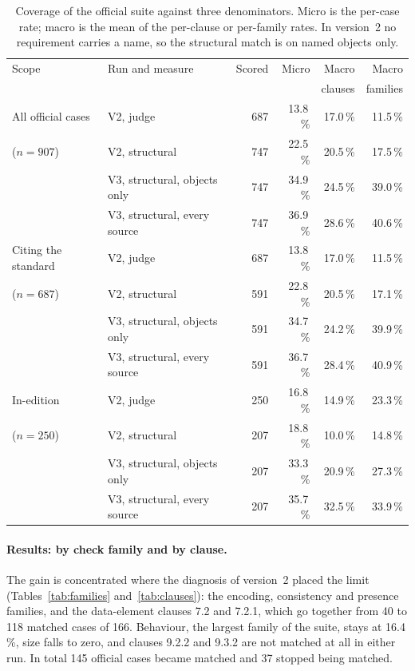 \begin{table}[t]
  \centering
  \caption{Coverage of the official suite against three denominators. Micro is
    the per-case rate; macro is the mean of the per-clause or per-family
    rates. In version~2 no requirement carries a name, so the structural
    match is on named objects only.}
  \label{tab:denominators}
  \small\setlength{\tabcolsep}{4pt}
  \begin{tabular}{llrrrr}
    \toprule
    Scope & Run and measure & Scored & Micro & Macro & Macro \\
          &                 &        &       & clauses & families \\
    \midrule
    All official cases & V2, judge                      & 687 & 13.8\,\% & 17.0\,\% & 11.5\,\% \\
    ($n = 907$)        & V2, structural                 & 747 & 22.5\,\% & 20.5\,\% & 17.5\,\% \\
                       & V3, structural, objects only   & 747 & 34.9\,\% & 24.5\,\% & 39.0\,\% \\
                       & V3, structural, every source   & 747 & 36.9\,\% & 28.6\,\% & 40.6\,\% \\
    \midrule
    Citing the standard & V2, judge                     & 687 & 13.8\,\% & 17.0\,\% & 11.5\,\% \\
    ($n = 687$)        & V2, structural                 & 591 & 22.8\,\% & 20.5\,\% & 17.1\,\% \\
                       & V3, structural, objects only   & 591 & 34.7\,\% & 24.2\,\% & 39.9\,\% \\
                       & V3, structural, every source   & 591 & 36.7\,\% & 28.4\,\% & 40.9\,\% \\
    \midrule
    In-edition         & V2, judge                      & 250 & 16.8\,\% & 14.9\,\% & 23.3\,\% \\
    ($n = 250$)        & V2, structural                 & 207 & 18.8\,\% & 10.0\,\% & 14.8\,\% \\
                       & V3, structural, objects only   & 207 & 33.3\,\% & 20.9\,\% & 27.3\,\% \\
                       & V3, structural, every source   & 207 & 35.7\,\% & 32.5\,\% & 33.9\,\% \\
    \bottomrule
  \end{tabular}
\end{table}

\paragraph{Results: by check family and by clause.}
The gain is concentrated where the diagnosis of version~2 placed the limit
(Tables~\ref{tab:families} and~\ref{tab:clauses}): the encoding, consistency
and presence families, and the data-element clauses 7.2 and 7.2.1, which go
together from 40 to 118 matched cases of 166. Behaviour, the largest family of
the suite, stays at 16.4\,\%, size falls to zero, and clauses 9.2.2 and 9.3.2
are not matched at all in either run. In total 145 official cases became
matched and 37 stopped being matched.

